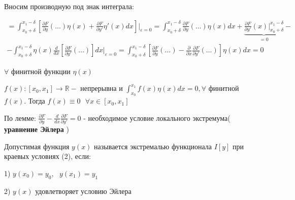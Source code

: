 \documentclass[12pt, a4paper]{report}
\begin{document}
Вносим производную под знак интеграла: 

\begin{gather*}
    \boxed{=} \int_{x_0 + \delta}^{x_1- \delta}\left[ \frac{\partial F}{\partial y }(\dots) \eta (x )+ \frac{\partial F}{\partial y'} \eta '(x) dx   \right] \bigg |_{\varepsilon=0}=   \int_{x_0 + \delta}^{x_1- \delta}\frac{\partial F}{\partial y }(\dots) \eta (x )dx+ \underbrace{\frac{\partial F}{\partial y'}(x) \bigg |^{x_1- \delta}_{x_0+\delta}    }_{=0}- \\
    -\int_{x_0 + \delta}^{x_1- \delta} \eta (x )\frac{d}{dx } \left[ \frac{\partial F}{\partial y' }(\dots) \right] dx \bigg | _{\varepsilon=0} =\int_{x_0 + \delta}^{x_1- \delta} \left[ \frac{\partial F}{\partial y}(\dots)- \frac{\partial}{\partial x} \frac{\partial F}{\partial y'}(\dots)    \right]\eta(x) dx  =0
\end{gather*}

\( \forall   \) финитной функции \( \eta (x)  \)

\begin{lemma}
    \( f(x) : [x_0,x_1] \to  \mathbb{R} -\) непрерывна и  \( \displaystyle \int_{x_0}^{x_1} f(x)\eta (x)dx=0, \forall   \) финитной \( f(x) \). Тогда \( f(x) \equiv 0 \text{ } \forall x \in  [x_0,x_1]   \) 
\end{lemma}

По лемме: \( \displaystyle \frac{\partial F}{\partial y}- \frac{d}{dx} \frac{\partial F}{\partial y '} =0     \) - необходимое условие локального экстремума( \textbf{уравнение Эйлера} )

\begin{definition}[экстремаль]
    Допустимая функция \( y(x) \) называется экстремалью функционала \( I[y] \)  при краевых условиях (2), если: 

    1) \( y(x_0)=y_0, \text{ } y(x_1)=y_1  \) 

    2) \( y(x) \) удовлетворяет условию Эйлера
\end{definition}



\ifdefined\mainfile
\else
    
\end{document}
